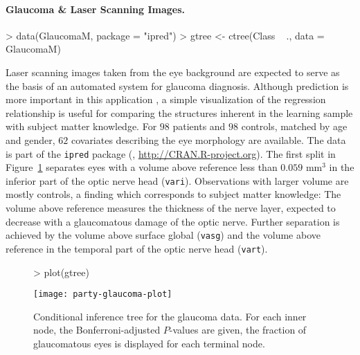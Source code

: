 \documentclass[letter]{article}
\begin{document}
\paragraph{Glaucoma \& Laser Scanning Images.}

\begin{Schunk}
\begin{Sinput}
> data(GlaucomaM, package = "ipred")
> gtree <- ctree(Class ~ ., data = GlaucomaM)
\end{Sinput}
\end{Schunk}


Laser scanning images taken from the eye background are expected to serve as 
the basis of an automated system for glaucoma diagnosis. 
Although prediction is more important in this application
\citep{new-glauco:2003}, a simple
visualization of the regression relationship is useful for comparing the
structures inherent in the learning sample with subject matter knowledge. 
For $98$ patients and $98$ controls, matched by age
and gender, $62$ covariates describing the eye morphology are available. The
data is part of the 
\texttt{ipred} package
(\cite{Rnews:Peters+Hothorn+Lausen:2002}, \url{http://CRAN.R-project.org}).
The first split in Figure~\ref{glaucoma} separates eyes with a volume 
above reference less than
$0.059 \text{ mm}^3$ in the inferior part of the
optic nerve head (\texttt{vari}). 
Observations with larger volume are mostly controls, a finding which
corresponds to subject matter knowledge: The volume above reference measures the
thickness of the nerve layer, expected to decrease with a glaucomatous
damage of the optic nerve. Further separation is achieved by the volume
above surface global (\texttt{vasg}) and the volume above reference in the
temporal part of the optic nerve head (\texttt{vart}).

\begin{figure}[t]
\begin{center}
\begin{Schunk}
\begin{Sinput}
> plot(gtree)
\end{Sinput}
\end{Schunk}
\texttt{[image: party-glaucoma-plot]}
\caption{Conditional inference tree for the glaucoma data. For each inner node, the
Bonferroni-adjusted $P$-values are given, the fraction of glaucomatous eyes
is displayed for each terminal node. \label{glaucoma}}
\end{center}
\end{figure}
\end{document}
